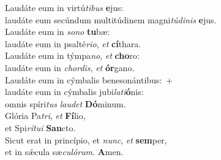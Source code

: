 \evenverse Laudáte eum in virtú\textit{ti}\textit{bus} \textbf{e}jus:~\*\\
\evenverse laudáte eum secúndum multitúdinem magni\textit{tú}\textit{di}\textit{nis} \textbf{e}jus.\\
\oddverse Laudáte eum in \textit{so}\textit{no} \textbf{tu}bæ:~\*\\
\oddverse laudáte eum in psalté\textit{ri}\textit{o}, \textit{et} \textbf{cí}thara.\\
\evenverse Laudáte eum in týmpa\textit{no}, \textit{et} \textbf{cho}ro:~\*\\
\evenverse laudáte eum in \textit{chor}\textit{dis}, \textit{et} \textbf{ór}gano.\\
\oddverse Laudáte eum in cýmbalis benesonántibus:~+\\
\oddverse  laudáte eum in cýmbalis jubi\textit{la}\textit{ti}\textbf{ó}nis:~\*\\
\oddverse omnis spíri\textit{tus} \textit{lau}\textit{det} \textbf{Dó}minum.\\
\evenverse Glória Pa\textit{tri}, \textit{et} \textbf{Fí}lio,~\*\\
\evenverse et Spi\textit{rí}\textit{tu}\textit{i} \textbf{San}cto.\\
\oddverse Sicut erat in princípio, et \textit{nunc}, \textit{et} \textbf{sem}per,~\*\\
\oddverse et in sǽcula sæ\textit{cu}\textit{ló}\textit{rum}. \textbf{A}men.\\
